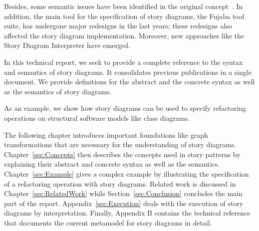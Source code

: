 Besides, some semantic issues have been identified in the original concept~\cite{TMG06}.
In addition, the main tool for the specification of story diagrams, the Fujaba tool suite, has undergone major redesigns in the last years; these redesigns also affected the story diagram implementation.
Moreover, new approaches like the Story Diagram Interpreter have emerged.

In this technical report, we seek to provide a complete reference to the syntax and semantics of story diagrams.
It consolidates previous publications in a single document.
We provide definitions for the abstract and the concrete syntax as well as the semantics of story diagrams.

As an example, we show how story diagrams can be used to specify refactoring operations on structural software models like class diagrams.

The following chapter introduces important foundations like graph transformations that are necessary for the understanding of story diagrams.
Chapter~\ref{sec:Concepts} then describes the concepts used in story patterns by explaining their abstract and concrete syntax as well as the semantics.
Chapter~\ref{sec:Example} gives a complex example by illustrating the specification of a refactoring operation with story diagrams.
Related work is discussed in Chapter~\ref{sec:RelatedWork} while Section~\ref{sec:Conclusion} concludes the main part of the report.
Appendix~\ref{sec:Execution} deals with the execution of story diagrams by interpretation.
Finally, Appendix B contains the technical reference that documents the current metamodel for story diagrams in detail.